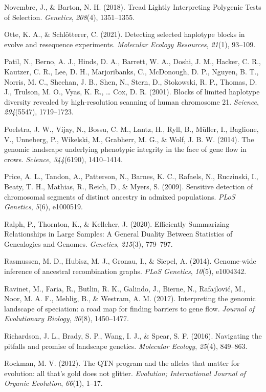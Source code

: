 \documentclass[twocolumn]{bmcart}%
\begin{document}
\begin{backmatter}
Novembre, J., \& Barton, N. H. (2018). Tread Lightly Interpreting
Polygenic Tests of Selection. \emph{Genetics}, \emph{208}(4),
1351--1355.

Otte, K. A., \& Schlötterer, C. (2021). Detecting selected haplotype
blocks in evolve and resequence experiments. \emph{Molecular Ecology
Resources}, \emph{21}(1), 93--109.

Patil, N., Berno, A. J., Hinds, D. A., Barrett, W. A., Doshi, J. M.,
Hacker, C. R., Kautzer, C. R., Lee, D. H., Marjoribanks, C., McDonough,
D. P., Nguyen, B. T., Norris, M. C., Sheehan, J. B., Shen, N., Stern,
D., Stokowski, R. P., Thomas, D. J., Trulson, M. O., Vyas, K. R.,
\ldots{} Cox, D. R. (2001). Blocks of limited haplotype diversity
revealed by high-resolution scanning of human chromosome 21.
\emph{Science}, \emph{294}(5547), 1719--1723.

Poelstra, J. W., Vijay, N., Bossu, C. M., Lantz, H., Ryll, B., Müller,
I., Baglione, V., Unneberg, P., Wikelski, M., Grabherr, M. G., \& Wolf,
J. B. W. (2014). The genomic landscape underlying phenotypic integrity
in the face of gene flow in crows. \emph{Science}, \emph{344}(6190),
1410--1414.

Price, A. L., Tandon, A., Patterson, N., Barnes, K. C., Rafaels, N.,
Ruczinski, I., Beaty, T. H., Mathias, R., Reich, D., \& Myers, S.
(2009). Sensitive detection of chromosomal segments of distinct ancestry
in admixed populations. \emph{PLoS Genetics}, \emph{5}(6), e1000519.

Ralph, P., Thornton, K., \& Kelleher, J. (2020). Efficiently Summarizing
Relationships in Large Samples: A General Duality Between Statistics of
Genealogies and Genomes. \emph{Genetics}, \emph{215}(3), 779--797.

Rasmussen, M. D., Hubisz, M. J., Gronau, I., \& Siepel, A. (2014).
Genome-wide inference of ancestral recombination graphs. \emph{PLoS
Genetics}, \emph{10}(5), e1004342.

Ravinet, M., Faria, R., Butlin, R. K., Galindo, J., Bierne, N.,
Rafajlović, M., Noor, M. A. F., Mehlig, B., \& Westram, A. M. (2017).
Interpreting the genomic landscape of speciation: a road map for finding
barriers to gene flow. \emph{Journal of Evolutionary Biology},
\emph{30}(8), 1450--1477.

Richardson, J. L., Brady, S. P., Wang, I. J., \& Spear, S. F. (2016).
Navigating the pitfalls and promise of landscape genetics.
\emph{Molecular Ecology}, \emph{25}(4), 849--863.

Rockman, M. V. (2012). The QTN program and the alleles that matter for
evolution: all that's gold does not glitter. \emph{Evolution;
International Journal of Organic Evolution}, \emph{66}(1), 1--17.


\end{backmatter}
\end{document}
